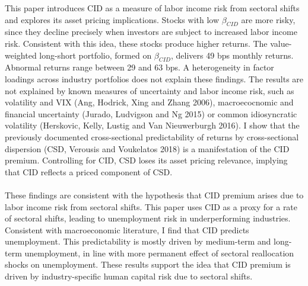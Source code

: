 \documentclass[12pt]{article}
\begin{document}
This paper introduces CID as a measure of labor income risk from sectoral shifts and explores its asset pricing implications. Stocks with low $\beta_{CID}$ are more risky, since they decline precisely when investors are subject to increased labor income risk. Consistent with this idea, these stocks produce higher returns. The value-weighted long-short portfolio, formed on $\beta_{CID}$, delivers 49 bps monthly returns. Abnormal returns range between 29 and 63 bps. A heterogeneity in factor loadings across industry portfolios does not explain these findings. The results are not explained by known measures of uncertainty and labor income risk, such as volatility and VIX (Ang, Hodrick, Xing and Zhang 2006), macroecocnomic and financial uncertainty (Jurado, Ludvigson and Ng 2015) or common idiosyncratic volatility (Herskovic, Kelly, Lustig and Van Nieuwerburgh 2016). I show that the previously documented cross-sectional predictability of returns by cross-sectional dispersion (CSD, Verousis and Voukelatos 2018) is a manifestation of the CID premium. Controlling for CID, CSD loses its asset pricing relevance, implying that CID reflects a priced component of CSD.
\paragraph{}
These findings are consistent with the hypothesis that CID premium arises due to labor income risk from sectoral shifts. This paper uses CID as a proxy for a rate of sectoral shifts, leading to unemployment risk in underperforming industries. Consistent with macroeconomic literature, I find that CID predicts unemployment. This predictability is mostly driven by medium-term and long-term unemployment, in line with more permanent effect of sectoral reallocation shocks on unemployment. These results support the idea that CID premium is driven by industry-specific human capital risk due to sectoral shifts.


\newpage
\end{document}
